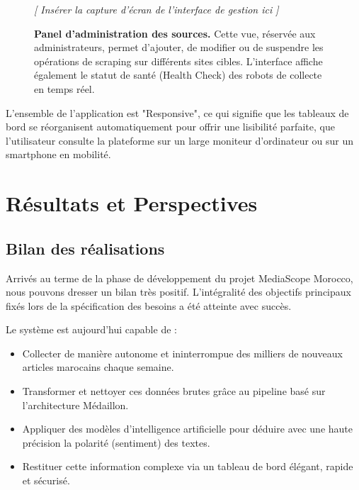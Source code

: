 \documentclass[12pt,a4paper,oneside]{report}
\begin{document}
\begin{figure}[H]
    \centering
    \begin{figbox}
        \vspace{7cm}
        \textcolor{textgray}{\Large \textit{[ Insérer la capture d'écran de l'interface de gestion ici ]}}
        \vspace{7cm}
    \end{figbox}
    \caption{\textbf{Panel d'administration des sources.} Cette vue, réservée aux administrateurs, permet d'ajouter, de modifier ou de suspendre les opérations de scraping sur différents sites cibles. L'interface affiche également le statut de santé (Health Check) des robots de collecte en temps réel.}
    \label{fig:scraping_ui}
\end{figure}

L'ensemble de l'application est "Responsive", ce qui signifie que les tableaux de bord se réorganisent automatiquement pour offrir une lisibilité parfaite, que l'utilisateur consulte la plateforme sur un large moniteur d'ordinateur ou sur un smartphone en mobilité.

\newpage

\chapter{Résultats et Perspectives}

\section{Bilan des réalisations}
Arrivés au terme de la phase de développement du projet MediaScope Morocco, nous pouvons dresser un bilan très positif. L'intégralité des objectifs principaux fixés lors de la spécification des besoins a été atteinte avec succès. 

Le système est aujourd'hui capable de :
\begin{itemize}[label=\textcolor{primary}{\checkmark}, itemsep=5pt]
    \item Collecter de manière autonome et ininterrompue des milliers de nouveaux articles marocains chaque semaine.
    \item Transformer et nettoyer ces données brutes grâce au pipeline basé sur l'architecture Médaillon.
    \item Appliquer des modèles d'intelligence artificielle pour déduire avec une haute précision la polarité (sentiment) des textes.
    \item Restituer cette information complexe via un tableau de bord élégant, rapide et sécurisé.
\end{itemize}
\end{document}
